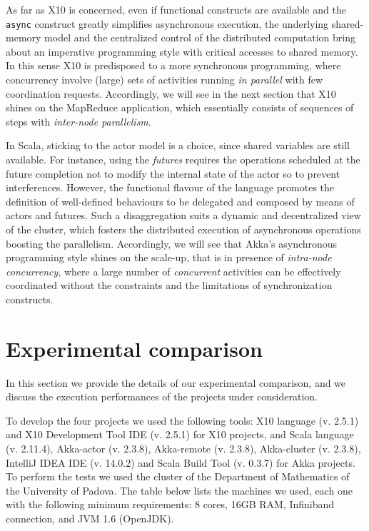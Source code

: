 \documentclass[a4paper]{article}
\numberwithin{equation}{section}
\begin{document}
As far as X10 is concerned, even if functional constructs are
available and the \verb+async+ construct greatly simplifies
asynchronous execution, the underlying shared-memory model and the
centralized control of the distributed computation bring about an
imperative programming style with critical accesses to shared memory.
In this sense X10 is predisposed to a more synchronous
programming, where concurrency involve (large) sets of activities
running \emph{in parallel} with few coordination
requests. Accordingly, we will see in the next section that X10 shines
on the MapReduce application, which essentially consists of sequences
of steps with \emph{inter-node parallelism}.

In Scala, sticking to the actor model is a choice, since shared
variables are still available. For instance, using the \emph{futures} 
requires the operations scheduled at the future completion not to
modify the internal state of the actor so to prevent interferences.
However, the functional flavour of the language
promotes the definition of well-defined behaviours to be delegated and
composed by means of actors and futures. Such a disaggregation suits a
dynamic and decentralized view of the cluster, which fosters the
distributed execution of asynchronous operations boosting 
the parallelism.  Accordingly, we will see that Akka's asynchronous
programming style shines on the scale-up, that is in presence of
\emph{intra-node concurrency}, 
where a large number of \emph{concurrent} activities can be
effectively coordinated without the constraints and the limitations of
synchronization constructs.




\section{Experimental comparison}
\label{sec:experiments}

In this section we provide the details of our experimental comparison,
and we discuss the execution performances of the projects under
consideration. 

To develop the four projects we used the following tools:
X10 language (v. 2.5.1) and X10 Development Tool IDE (v. 2.5.1) for
X10 projects, and
Scala language (v. 2.11.4), Akka-actor (v. 2.3.8), Akka-remote
(v. 2.3.8), Akka-cluster (v. 2.3.8), IntelliJ IDEA IDE (v. 14.0.2)
and Scala Build Tool (v. 0.3.7) for Akka projects.
To perform the tests we used the cluster of the Department of
Mathematics of the University of Padova. 
The table below lists the machines we used, each
one with the following minimum requirements: 
8 cores, 16GB RAM, Infiniband connection, and 
JVM 1.6 (OpenJDK).
\end{document}
